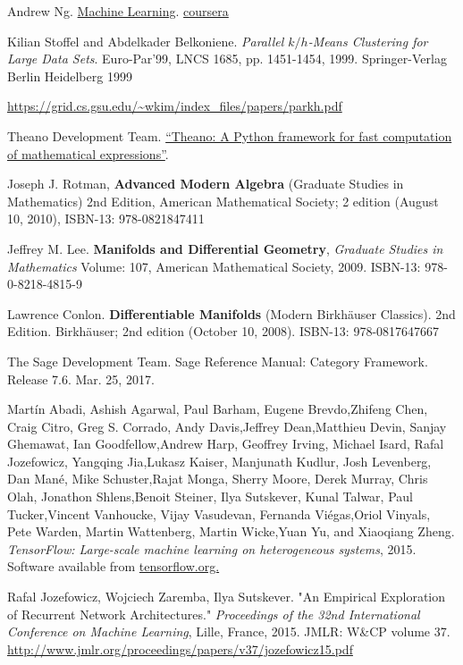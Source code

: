 \documentclass[10pt]{amsart}
\begin{document}
\begin{thebibliography}{9}
Andrew Ng.  \href{https://www.coursera.org/learn/machine-learning/home/welcome}{Machine Learning}.  \href{https://www.coursera.org}{coursera}


Kilian Stoffel and Abdelkader Belkoniene.  \emph{Parallel $k/h$-Means Clustering for Large Data Sets}.  Euro-Par'99, LNCS 1685, pp. 1451-1454, 1999.  Springer-Verlag Berlin Heidelberg 1999

\url{https://grid.cs.gsu.edu/~wkim/index_files/papers/parkh.pdf}

Theano Development Team. \href{http://arxiv.org/pdf/1605.02688.pdf}{“Theano: A Python framework for fast computation of mathematical expressions”}. 

Joseph J. Rotman, \textbf{Advanced Modern Algebra} (Graduate Studies in Mathematics) 2nd Edition, American Mathematical Society; 2 edition (August 10, 2010), ISBN-13: 978-0821847411

Jeffrey M. Lee. \textbf{Manifolds and Differential Geometry}, \emph{Graduate Studies in Mathematics} Volume: 107, American Mathematical Society, 2009. ISBN-13: 978-0-8218-4815-9

Lawrence Conlon.  \textbf{Differentiable Manifolds} (Modern Birkhäuser Classics).  2nd Edition.  Birkhäuser; 2nd edition (October 10, 2008).  ISBN-13: 978-0817647667

The Sage Development Team.  Sage Reference Manual: Category Framework.  Release 7.6.  Mar. 25, 2017.  

Martín Abadi, Ashish Agarwal, Paul Barham, Eugene Brevdo,Zhifeng Chen, Craig Citro, Greg S. Corrado, Andy Davis,Jeffrey Dean,Matthieu Devin, Sanjay Ghemawat, Ian Goodfellow,Andrew Harp, Geoffrey Irving, Michael Isard, Rafal Jozefowicz, Yangqing Jia,Lukasz Kaiser, Manjunath Kudlur, Josh Levenberg, Dan Mané, Mike Schuster,Rajat Monga, Sherry Moore, Derek Murray, Chris Olah, Jonathon Shlens,Benoit Steiner, Ilya Sutskever, Kunal Talwar, Paul Tucker,Vincent Vanhoucke, Vijay Vasudevan, Fernanda Viégas,Oriol Vinyals, Pete Warden, Martin Wattenberg, Martin Wicke,Yuan Yu, and Xiaoqiang Zheng.  
\emph{TensorFlow: Large-scale machine learning on heterogeneous systems}, 2015. Software available from \href{http://tensorflow.org/}{tensorflow.org.}

Rafal Jozefowicz, Wojciech Zaremba, Ilya Sutskever.  "An Empirical Exploration of Recurrent Network Architectures."  \emph{Proceedings of the 32nd
International  Conference on  Machine Learning}, Lille, France, 2015.  JMLR: W\&CP volume 37.  \url{http://www.jmlr.org/proceedings/papers/v37/jozefowicz15.pdf} 


\end{thebibliography}
\end{document}

